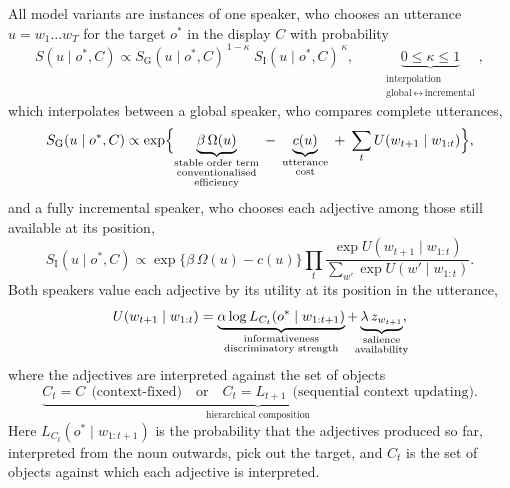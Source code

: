 \documentclass[10pt,a4paper,fleqn]{article}
\begin{document}
All model variants are instances of one speaker, who chooses an utterance $u=w_1\ldots w_T$ for the target $o^*$ in the display $C$ with probability
\begin{equation}
  S(u\mid o^*,C)
  \propto
  S_{\mathrm{G}}(u\mid o^*,C)^{\,1-\kappa}\;
  S_{\mathrm{I}}(u\mid o^*,C)^{\,\kappa},
  \qquad
  \underbrace{0\le\kappa\le1}_{\substack{\text{interpolation}\\[1pt]\text{global}\,\leftrightarrow\,\text{incremental}}},
  \label{eq:full-speaker}
\end{equation}
which interpolates between a global speaker, who compares complete utterances,
\begin{equation}
  S_{\mathrm{G}}(u\mid o^*,C)
  \propto
  \exp\Bigl\{
  \underbrace{\beta\,\Omega(u)}_{\substack{\text{stable order term}\\[1pt]\text{conventionalised}\\[1pt]\text{efficiency}}}
  \;-\;\underbrace{c(u)}_{\substack{\text{utterance}\\[1pt]\text{cost}}}
  \;+\;\sum_{t} U(w_{t+1}\mid w_{1:t})
  \Bigr\},
  \label{eq:global-speaker}
\end{equation}
and a fully incremental speaker, who chooses each adjective among those still available at its position,
\begin{equation}
  S_{\mathrm{I}}(u\mid o^*,C)
  \propto
  \exp\bigl\{\beta\,\Omega(u)-c(u)\bigr\}
  \prod_{t}
  \frac{\exp U(w_{t+1}\mid w_{1:t})}{\sum_{w'}\exp U(w'\mid w_{1:t})}.
  \label{eq:incremental-speaker}
\end{equation}
Both speakers value each adjective by its utility at its position in the utterance,
\begin{equation}
  U(w_{t+1}\mid w_{1:t})
  =
  \underbrace{\alpha\log L_{C_t}(o^*\mid w_{1:t+1})}_{\mathclap{\substack{\text{informativeness}\\[1pt]\text{discriminatory strength}}}}
  +\underbrace{\lambda\,z_{w_{t+1}}}_{\mathclap{\substack{\text{salience}\\[1pt]\text{availability}}}},
  \label{eq:adjective-utility}
\end{equation}
where the adjectives are interpreted against the set of objects
\begin{equation}
  \underbrace{C_t=C\ \ \text{(context-fixed)}\quad\text{or}\quad C_t=L_{t+1}\ \ \text{(sequential context updating)}}_{\text{hierarchical composition}}.
  \label{eq:comparison-class}
\end{equation}
Here $L_{C_t}(o^*\mid w_{1:t+1})$ is the probability that the adjectives produced so far, interpreted from the noun outwards, pick out the target, and $C_t$ is the set of objects against which each adjective is interpreted.
\end{document}
